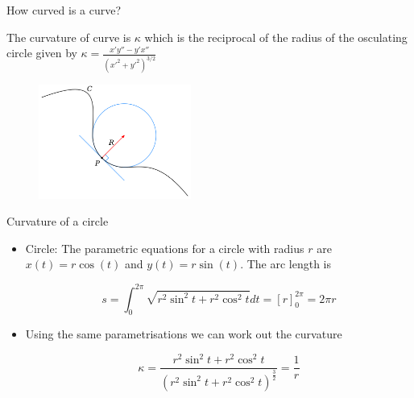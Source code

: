 \documentclass{beamer}
\begin{document}
\begin{frame}{How curved is a curve?}
	\begin{Theorem}[Curvature]
		The curvature of curve is $\kappa$ which is the reciprocal of the radius of the {\alert{osculating circle}} given by
		$\kappa=\frac{x' y'' - y' x''}{(x'^2+y'^2)^{3/2}}$
	\end{Theorem}
	\begin{figure}
	\centering
	\includegraphics[width=50mm, scale=0.4]{Curvature_circle.png}
\end{figure}
\end{frame}

\begin{frame}{Curvature of a circle}
	\begin{itemize}	
		
		\item Circle: The parametric equations for a circle with radius $r$ are $x(t)=r \cos(t)$ and $y(t)= r \sin(t)$. The arc length is 
		
		\[	
		s = \int_{0}^{2 \pi} \sqrt{r^2 \sin^2 t + r^2 \cos^2 t}dt = \left[r \right]_{0}^{2 \pi} = 2 \pi r
		\]
	
		\item Using the same parametrisations we can work out the curvature
		
		\[
		\kappa = \frac{r^2 \sin^2 t + r^2 \cos^2 t}{\left(r^2 \sin^2 t + r^2 \cos^2 t \right) ^ \frac{3}{2}} = \frac{1}{r}
		\]
		
	\end{itemize}
\end{frame}
\end{document}
